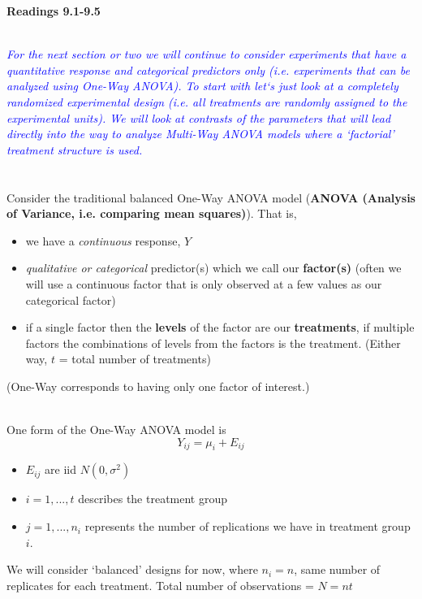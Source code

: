 \begin{center}\Large\textbf{Readings 9.1-9.5%
}\\
\normalsize \end{center}
\large ~\hrulefill
~\\\textit{\textcolor{blue}{For the next section or two we will continue to consider experiments that have a quantitative response and categorical predictors only (i.e. experiments that can be analyzed using One-Way ANOVA).  To start with let`s just look at a completely randomized experimental design (i.e. all treatments are randomly assigned to the experimental units).  We will look at contrasts of the parameters that will lead directly into the way to analyze Multi-Way ANOVA models where a `factorial' treatment structure is used.}}\\~\\~\\

Consider the traditional balanced One-Way ANOVA model (\textbf{ANOVA (Analysis of Variance, i.e. comparing mean squares)}).  That is,
\begin{itemize}
\item we have a \textit{continuous} response, $Y$
\item \textit{qualitative or categorical} predictor(s) which we call our \textbf{factor(s)} (often we will use a continuous factor that is only observed at a few values as our categorical factor)
\item if a single factor then the \textbf{levels} of the factor are our \textbf{treatments}, if multiple factors the combinations of levels from the factors is the treatment. (Either way, $t$ = total number of treatments)
\end{itemize}
(One-Way corresponds to having only one factor of interest.)\\~\\

\newpage

One form of the One-Way ANOVA model is
$$Y_{ij}=\mu_{i}+E_{ij}$$
\begin{itemize}
\item $E_{ij}$ are iid $N(0,\sigma^2)$
\item $i=1,...,t$ describes the treatment group
\item $j=1,...,n_i$ represents the number of replications we have in treatment group $i$. 
\end{itemize}
We will consider `balanced' designs for now, where $n_i=n$, same number of replicates for each treatment.  Total number of observations = $N = nt$\\~\\


